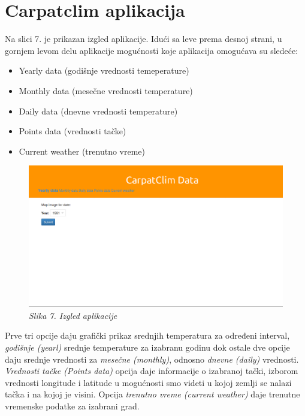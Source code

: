 \documentclass[12pt]{article}
\begin{document}
\newpage


\section{Carpatclim aplikacija}

Na slici 7. je prikazan izgled aplikacije. Idući sa leve prema desnoj strani, u gornjem levom delu aplikacije mogućnosti koje aplikacija omogućava su sledeće: 
\begin{itemize}
	\item Yearly data (godišnje vrednosti temeperature) 
	\item Monthly data (mesečne vrednosti temperature)
	\item Daily data (dnevne vrednosti temperature)
	\item Points data (vrednosti tačke)
	\item Current weather (trenutno vreme)
\end{itemize}


\begin{figure}[h!]
	\centering
	\includegraphics[width=1\linewidth]{aplikacija.png}
	\caption*{\textsl{Slika 7. Izgled aplikacije}}
\end{figure}

Prve tri opcije daju grafički prikaz srednjih temperatura za određeni interval, \textit{godišnje (yearl)} srednje temperature za izabranu godinu dok ostale dve opcije daju srednje vrednosti za \textit{mesečne (monthly)}, odnosno \textit{dnevne (daily)} vrednosti. \textit{Vrednosti tačke (Points data)} opcija daje informacije o izabranoj tački, izborom vrednosti longitude i latitude u mogućnosti smo videti u kojoj zemlji se nalazi tačka i na kojoj je visini. Opcija \textit{trenutno vreme (current weather)} daje trenutne vremenske podatke za izabrani grad. 
\end{document}
